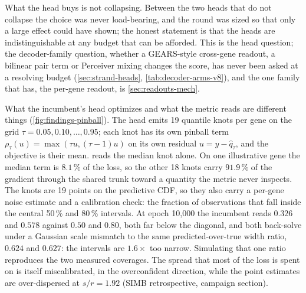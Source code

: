 What the head buys is not collapsing. Between the two heads that do not collapse the
choice was never load-bearing, and the round was sized so that only a large effect could
have shown; the honest statement is that the heads are indistinguishable at any budget
that can be afforded. This is the head question; the decoder-family question, whether a
GEARS-style cross-gene readout, a bilinear pair term or Perceiver mixing changes the
score, has never been asked at a resolving budget (\cref{sec:strand-heads},
\cref{tab:decoder-arms-v8}), and the one family that has, the per-gene readout, is
\cref{sec:readouts-mech}.

What the incumbent's head optimizes and what the metric reads are different things
(\cref{fig:findings-pinball}). The head emits 19 quantile knots per gene on the grid
$\tau = 0.05, 0.10, \ldots, 0.95$; each knot has its own pinball term
$\rho_\tau(u) = \max(\tau u, (\tau - 1) u)$ on its own residual $u = y - \hat q_\tau$,
and the objective is their mean.  reads the median knot alone.
On one illustrative gene the median term is $8.1\,\%$ of the loss, so the other 18 knots
carry $91.9\,\%$ of the gradient through the shared trunk toward a quantity the metric
never inspects. The knots are 19 points on the predictive CDF, so they also carry a
per-gene noise estimate and a calibration check: the fraction of observations that fall
inside the central 50\,\% and 80\,\% intervals. At epoch 10{,}000 the incumbent reads
$0.326$ and $0.578$ against $0.50$ and $0.80$, both far below the diagonal, and both
back-solve under a Gaussian scale mismatch to the same predicted-over-true width ratio,
$0.624$ and $0.627$: the intervals are $1.6\times$ too narrow. Simulating that one ratio
reproduces the two measured coverages. The spread that most of the loss is spent on is
itself miscalibrated, in the overconfident direction, while the point estimates are
over-dispersed at $s/r = 1.92$ (SIMB retrospective, campaign section).

